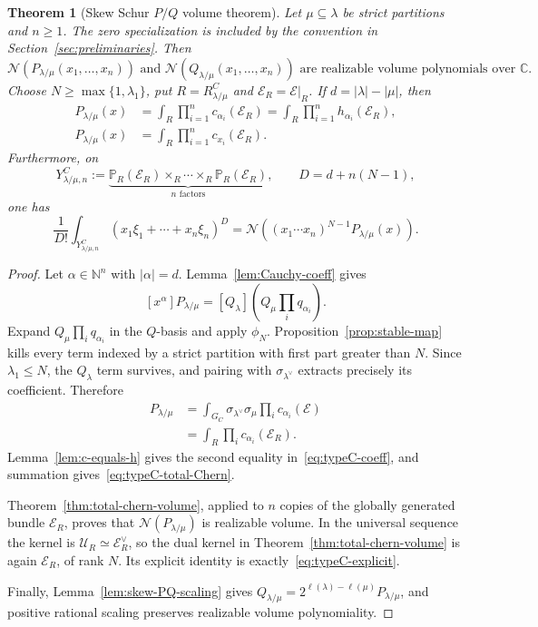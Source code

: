 \documentclass[11pt,a4paper,oneside]{amsart}
\numberwithin{equation}{section}
\newtheorem{theorem}{Theorem}[section]
\theoremstyle{definition}
\theoremstyle{remark}
\newcommand{\N}{\mathbb N}
\newcommand{\C}{\mathbb C}
\newcommand{\cN}{\mathcal N}
\newcommand{\cE}{\mathcal E}
\newcommand{\cU}{\mathcal U}
\begin{document}
\begin{theorem}[Skew Schur $P/Q$ volume theorem]\label{thm:main-PQ}
Let $\mu\subseteq\lambda$ be strict partitions and $n\geq1$.  The zero specialization is included by the convention in Section~\ref{sec:preliminaries}.  Then
\begin{equation}\label{eq:main-PQ}
 \cN(P_{\lambda/\mu}(x_1,\ldots,x_n))
 \text{ and }
 \cN(Q_{\lambda/\mu}(x_1,\ldots,x_n))
 \text{ are realizable volume polynomials over }\C.
\end{equation}
Choose $N\geq\max\{1,\lambda_1\}$, put $R=R^C_{\lambda/\mu}$ and $\cE_R=\cE|_R$.  If $d=|\lambda|-|\mu|$, then
\begin{align}
 [x^\alpha]P_{\lambda/\mu}(x)
 &=\int_R\prod_{i=1}^nc_{\alpha_i}(\cE_R)
 =\int_R\prod_{i=1}^nh_{\alpha_i}(\cE_R),
 \label{eq:typeC-coeff}\\
 P_{\lambda/\mu}(x)
 &=\int_R\prod_{i=1}^nc_{x_i}(\cE_R).
 \label{eq:typeC-total-Chern}
\end{align}
Furthermore, on
\[
 Y^C_{\lambda/\mu,n}
 :=\underbrace{\mathbb P_R(\cE_R)\times_R\cdots\times_R\mathbb P_R(\cE_R)}_{n\text{ factors}},
 \qquad D=d+n(N-1),
\]
one has
\begin{equation}\label{eq:typeC-explicit}
 \frac1{D!}\int_{Y^C_{\lambda/\mu,n}}
 (x_1\xi_1+\cdots+x_n\xi_n)^D
 =\cN\!\left((x_1\cdots x_n)^{N-1}P_{\lambda/\mu}(x)\right).
\end{equation}
\end{theorem}

\begin{proof}
Let $\alpha\in\N^n$ with $|\alpha|=d$.  Lemma~\ref{lem:Cauchy-coeff} gives
\[
 [x^\alpha]P_{\lambda/\mu}
 =[Q_\lambda]\left(Q_\mu\prod_i q_{\alpha_i}\right).
\]
Expand $Q_\mu\prod_i q_{\alpha_i}$ in the $Q$-basis and apply $\phi_N$.  Proposition~\ref{prop:stable-map} kills every term indexed by a strict partition with first part greater than $N$.  Since $\lambda_1\leq N$, the $Q_\lambda$ term survives, and pairing with $\sigma_{\lambda^\vee}$ extracts precisely its coefficient.  Therefore
\begin{align*}
 [x^\alpha]P_{\lambda/\mu}
 &=\int_{G_C}\sigma_{\lambda^\vee}\sigma_\mu
   \prod_i c_{\alpha_i}(\cE)\\
 &=\int_R\prod_i c_{\alpha_i}(\cE_R).
\end{align*}
Lemma~\ref{lem:c-equals-h} gives the second equality in~\eqref{eq:typeC-coeff}, and summation gives~\eqref{eq:typeC-total-Chern}.

Theorem~\ref{thm:total-chern-volume}, applied to $n$ copies of the globally generated bundle $\cE_R$, proves that $\cN(P_{\lambda/\mu})$ is realizable volume.  In the universal sequence the kernel is $\cU_R\simeq\cE_R^\vee$, so the dual kernel in Theorem~\ref{thm:total-chern-volume} is again $\cE_R$, of rank $N$.  Its explicit identity is exactly~\eqref{eq:typeC-explicit}.

Finally, Lemma~\ref{lem:skew-PQ-scaling} gives
$Q_{\lambda/\mu}=2^{\ell(\lambda)-\ell(\mu)}P_{\lambda/\mu}$, and positive rational scaling preserves realizable volume polynomiality.
\end{proof}
\end{document}
